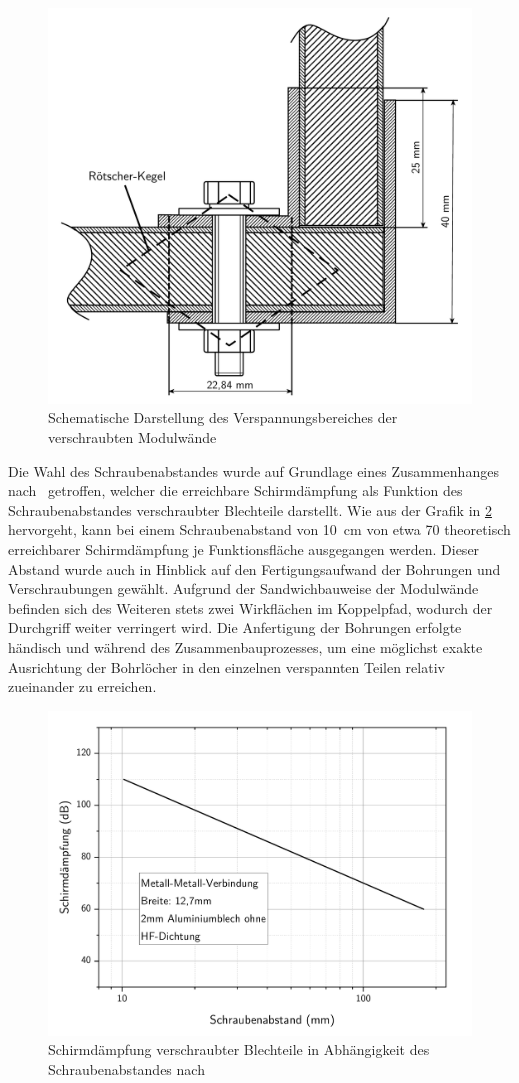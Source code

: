 \begin{figure}[ht]
    \centering
    \includegraphics[page=1, trim=0cm 0cm 0cm 0cm, clip, width = .45\textwidth]{Abbildungen/Kapitel3/Schematik_Verspannungskegel.pdf}
    \caption{Schematische Darstellung des Verspannungsbereiches der verschraubten Modulwände}
    \label{fig:3_Verspannungskegel_L-Profile}
\end{figure}


Die Wahl des Schraubenabstandes wurde auf Grundlage eines Zusammenhanges nach~\cite{Design_of_shielded_enclosures} getroffen, welcher die erreichbare Schirmdämpfung als Funktion des Schraubenabstandes verschraubter Blechteile darstellt. Wie aus der Grafik in \Abb\ref{fig:3_Schirmwirkung_Schraubenabstand} hervorgeht, kann bei einem Schraubenabstand von \SI{10}{\centi\meter} von etwa \SI{70}{\Dezibel} theoretisch erreichbarer Schirmdämpfung je Funktionsfläche ausgegangen werden. Dieser Abstand wurde auch in Hinblick auf den Fertigungsaufwand der Bohrungen und Verschraubungen gewählt. Aufgrund der Sandwichbauweise der Modulwände befinden sich des Weiteren stets zwei Wirkflächen im Koppelpfad, wodurch der Durchgriff weiter verringert wird. Die Anfertigung der Bohrungen erfolgte händisch und während des Zusammenbauprozesses, um eine möglichst exakte Ausrichtung der Bohrlöcher in den einzelnen verspannten Teilen relativ zueinander zu erreichen.  


\begin{figure}[ht]
    \centering
    \includegraphics[page = 1, trim = 0cm 0cm 0cm 0cm, clip, width=.65\textwidth]{Abbildungen/Kapitel3/Schraubenabstand_Schirmwirkung.pdf}
    \caption[Schirmdämpfung verschraubter Blechteile in Abhängigkeit des Schraubenabstandes]{Schirmdämpfung verschraubter Blechteile in Abhängigkeit des Schraubenabstandes nach~\cite{Design_of_shielded_enclosures}}
    \label{fig:3_Schirmwirkung_Schraubenabstand}
\end{figure}

